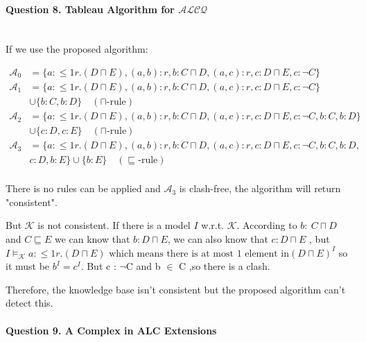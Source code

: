 \documentclass[12pt]{article}
\begin{document}
    \paragraph{Question 8. Tableau Algorithm for $\mathcal{ALCQ}$}~{}
    \\

    If we use the proposed algorithm: \par
    \begin{equation}
        \begin{aligned}
            \mathcal{A}_0&=\{a: \leq 1 r .(D \sqcap E),(a, b): r, b: C \sqcap D,(a, c): r, c: D \sqcap E, c: \neg C\} \\
            \mathcal{A}_1 &=\{a: \leq 1 r .(D \sqcap E),(a, b): r, b: C \sqcap D,(a, c): r, c: D \sqcap E, c: \neg C\} \\ &\cup\{b: C, b: D\} \quad (\sqcap\text{-rule})\\
            \mathcal{A}_2 &=\{a: \leq 1 r .(D \sqcap E),(a, b): r, b: C \sqcap D,(a, c): r, c: D \sqcap E, c: \neg C, b: C, b: D\} \\ & \cup\{c: D, c: E\} \quad (\sqcap\text{-rule}) \\
            \mathcal{A}_3 &=\{a: \leq 1 r .(D \sqcap E),(a, b): r, b: C \sqcap D,(a, c): r, c: D \sqcap E, c: \neg C, b: C, b: D, \\&c: D, b: E\}\cup\{b: E\} \quad (\sqsubseteq\text{-rule})\\
            \nonumber
        \end{aligned}
    \end{equation} \par
    There is no rules can be applied and $\mathcal{A}_3$ is clash-free, the algorithm will return "consistent".\par
    But $\mathcal{K}$ is not consistent. If there is a model $I$ w.r.t. $\mathcal{K}$. According to $b:\  C\sqcap D $ and $C \sqsubseteq E$ we can know that $b: D \sqcap E$, we can also know that $c: D \sqcap E$ , but $I \vDash_{\mathcal{K}} a: \leq 1 r .(D \sqcap E) \text{ which means there is } \text{at most 1 element in} (D \sqcap E)^I$
    so it must be $b^I = c^I$. But c : $\lnot$C and b $\in$ C ,so there is a clash.  \par
    Therefore, the knowledge base isn't consistent but the proposed algorithm can't detect this.

    \paragraph{Question 9. A Complex in ALC Extensions}~{}
    \\
\end{document}
